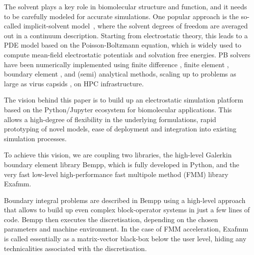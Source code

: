 The solvent plays a key role in biomolecular structure and function, and it needs to be carefully modeled for accurate simulations. 
One popular approach is the so-called implicit-solvent model~\cite{RouxSimonson1999,DescherchiETal2015}, where the solvent degrees of freedom are averaged out in a continuum description.
Starting from electrostatic theory, this leads to a PDE model based on the Poisson-Boltzmann equation, which is widely used to compute mean-field electrostatic potentials and solvation free energies.
PB solvers have been numerically implemented using finite difference \cite{delphi, apbs}, finite element \cite{apbs}, boundary element \cite{afmpb, tabi, pygbe}, and (semi) analytical \cite{thg} methods, scaling up to problems as large as virus capsids \cite{lu,MartinezETal2019}, on HPC infrastructure.

The vision behind this paper is to build up an electrostatic simulation platform based on the Python/Jupyter ecosystem for biomolecular applications. This allows a high-degree of flexibility in the underlying formulations, rapid prototyping of novel models, ease of deployment and integration into existing simulation processes.

To achieve this vision, we are coupling two libraries, the high-level Galerkin boundary element library Bempp, which is fully developed in Python, and the very fast low-level high-performance fast multipole method (FMM) library Exafmm. 

Boundary integral problems are described in Bempp using a high-level approach that allows to build up even complex block-operator systems in just a few lines of code. Bempp then executes the discretisation, depending on the chosen parameters and machine environment. In the case of FMM acceleration, Exafmm is called essentially as a matrix-vector black-box below the user level, hiding any technicalities associated with the discretisation.

